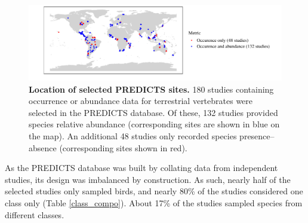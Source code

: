 \begin{figure}[h!]
\centering
\includegraphics[scale=0.75]{figures/chapter3/Sites}
\caption[Location of selected PREDICTS sites]{\textbf{Location of selected PREDICTS sites.} 180 studies containing occurrence or abundance data for terrestrial vertebrates were selected in the PREDICTS database. Of these, 132 studies provided species relative abundance (corresponding sites are shown in blue on the map). An additional 48 studies only recorded species presence--absence (corresponding sites shown in red).}
\label{PREDICTS_maps}
\end{figure}

As the PREDICTS database was built by collating data from independent studies, its design was imbalanced by construction. As such, nearly half of the selected studies only sampled birds, and nearly 80\% of the studies considered one class only (Table \ref{class_compo}). About 17\% of the studies sampled species from different classes. 

